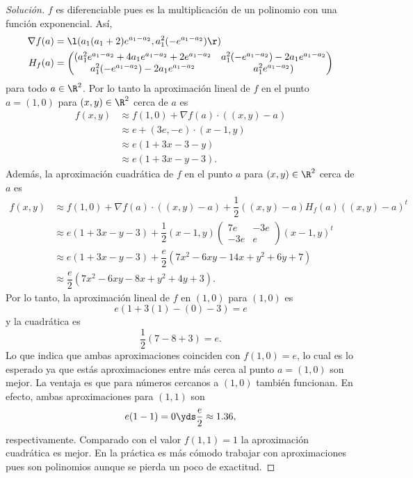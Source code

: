 \documentclass[a4,11pt]{aleph-notas}
\begin{document}
\begin{proof}[Solución]
$f$ es diferenciable pues es la multiplicación de un polinomio con una función exponencial. Así,
    \begin{align*}
        \nabla f(a)&= \l(a_1 (a_1 + 2) e^{a_1 - a_2}, a_1^2 (-e^{a_1 - a_2})\r)\\
        H_f(a)&=
        \begin{pmatrix}
            (a_1^2 e^{a_1 - a_2} + 4 a_1 e^{a_1 - a_2} + 2 e^{a_1 - a_2} & a_1^2 (-e^{a_1 - a_2}) - 2 a_1 e^{a_1 - a_2}\\
            a_1^2 (-e^{a_1 - a_2}) - 2 a_1 e^{a_1 - a_2} & a_1^2 e^{a_1 - a_2})  
        \end{pmatrix}
    \end{align*}
    para todo $a\in\R^2$. Por lo tanto la aproximación lineal de $f$ en el punto $a=(1,0)$ para $(x,y)\in\R^2$ cerca de $a$ es
    \begin{align*}
        f(x,y)
        &\approx f(1,0)+\nabla f (a) \cdot ((x,y)-a)\\
        &\approx e+(3e,-e) \cdot (x-1,y)\\
        &\approx e(1+3x-3-y)\\
        &\approx e(1+3x-y-3).
    \end{align*}
    Además, la aproximación cuadrática de $f$ en el punto $a$ para $(x,y)\in\R^2$ cerca de $a$ es
    \begin{align*}
        f(x,y)
        &\approx f(1,0)+\nabla f (a) \cdot ((x,y)-a)+\dfrac1 2 ((x,y)-a) H_f(a) ((x,y)-a)^t\\
        &\approx e(1+3x-y-3)+\dfrac1 2 (x-1,y) 
        \begin{pmatrix}
            7e & -3e\\ 
            -3e &e
        \end{pmatrix}
        (x-1,y)^t\\
        &\approx e(1+3x-y-3)+\dfrac{e}2(7 x^2 - 6 x y - 14 x + y^2 + 6 y + 7)\\
        &\approx \dfrac{e}{2}(7 x^2 - 6 x y - 8 x + y^2 + 4 y + 3).
    \end{align*}
    Por lo tanto, la aproximación lineal de $f$ en $(1,0)$ para $(1,0)$ es
    \[
        e(1+3(1)-(0)-3)=e
    \]
    y la cuadrática es
    \[
        \dfrac{1}{2}(7-8+3)=e.
    \]
    Lo que indica que ambas aproximaciones coinciden con $f(1,0)=e$, lo cual es lo esperado ya que estás aproximaciones entre más cerca al punto $a=(1,0)$ son mejor. La ventaja es que para números cercanos a $(1,0)$ también funcionan. En efecto, ambas aproximaciones para $(1,1)$ son
    \[
        e(1-1)= 0 \yds \dfrac{e}2\approx 1.36,
    \]
    respectivamente. Comparado con el valor $f(1,1)=1$ la aproximación cuadrática es mejor. En la práctica es más cómodo trabajar con aproximaciones pues son polinomios aunque se pierda un poco de exactitud.
\end{proof}
\end{document}
